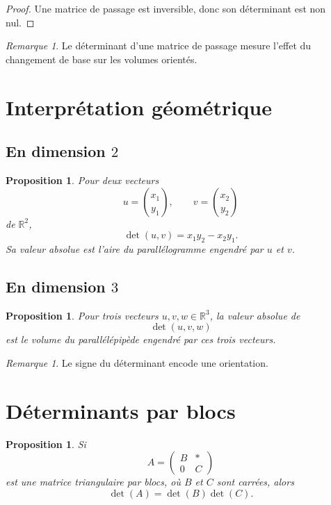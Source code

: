 \documentclass[11pt,a4paper]{article}
\newtheorem{proposition}[definition]{Proposition}
\theoremstyle{remark}
\newtheorem{remarque}[definition]{Remarque}
\newcommand{\R}{\mathbb{R}}
\begin{document}
\begin{proof}
Une matrice de passage est inversible, donc son déterminant est non nul.
\end{proof}

\begin{remarque}
Le déterminant d’une matrice de passage mesure l’effet du changement de base sur les volumes orientés.
\end{remarque}

\section{Interprétation géométrique}

\subsection{En dimension \(2\)}

\begin{proposition}
Pour deux vecteurs
\[
u=\binom{x_1}{y_1},
\qquad
v=\binom{x_2}{y_2}
\]
de \(\R^2\),
\[
\det(u,v)=x_1y_2-x_2y_1.
\]
Sa valeur absolue est l’aire du parallélogramme engendré par \(u\) et \(v\).
\end{proposition}

\subsection{En dimension \(3\)}

\begin{proposition}
Pour trois vecteurs \(u,v,w\in\R^3\), la valeur absolue de
\[
\det(u,v,w)
\]
est le volume du parallélépipède engendré par ces trois vecteurs.
\end{proposition}

\begin{remarque}
Le signe du déterminant encode une orientation.
\end{remarque}

\section{Déterminants par blocs}

\begin{proposition}
Si
\[
A=
\begin{pmatrix}
B & *\\
0 & C
\end{pmatrix}
\]
est une matrice triangulaire par blocs, où \(B\) et \(C\) sont carrées, alors
\[
\det(A)=\det(B)\det(C).
\]
\end{proposition}
\end{document}
